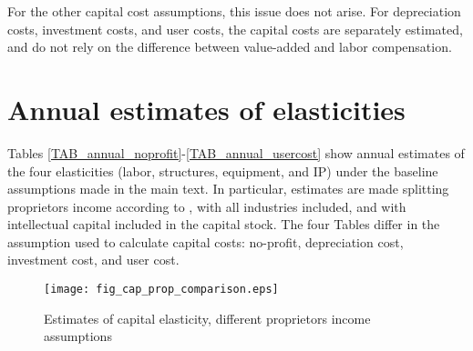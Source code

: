 \documentclass[11pt]{article}
\begin{document}
For the other capital cost assumptions, this issue does not arise. For depreciation costs, investment costs, and user costs, the capital costs are separately estimated, and do not rely on the difference between value-added and labor compensation.

\section{Annual estimates of elasticities}
Tables \ref{TAB_annual_noprofit}-\ref{TAB_annual_usercost} show annual estimates of the four elasticities (labor, structures, equipment, and IP) under the baseline assumptions made in the main text. In particular, estimates are made splitting proprietors income according to \cite{gommerupert2004}, with all industries included, and with intellectual capital included in the capital stock. The four Tables differ in the assumption used to calculate capital costs: no-profit, depreciation cost, investment cost, and user cost. 

\onehalfspacing
{\small


}


\begin{figure}[!htb]
\begin{center}
\caption{Estimates of capital elasticity, different proprietors income assumptions}
\label{FIG_cap_prop}
\texttt{[image: fig\_cap\_prop\_comparison.eps]}
\end{center}
\vspace{-.5cm}
\end{figure}
\end{document}
